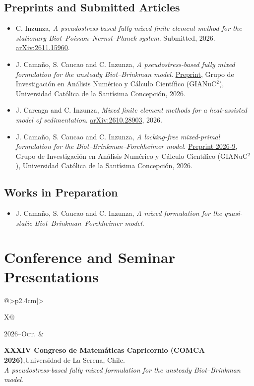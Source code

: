 \documentclass[letterpaper,12pt]{article}
\makeatletter
\newcommand{\CVEntry}[2]{%
\noindent\begin{tabularx}{\linewidth}{@{}>{\raggedleft\arraybackslash}p{2.4cm}|>{\raggedright\arraybackslash}X@{}}
\textsc{#1} & \begin{minipage}[t]{\linewidth}#2\end{minipage}
\end{tabularx}\vspace{0.45ex}}
\newcommand{\PubSpace}{\vspace{0.3mm}}
\makeatother
\begin{document}
\subsection*{Preprints and Submitted Articles}
\begin{itemize}
\item {\sc C. Inzunza},
    {\it A pseudostress-based fully mixed finite element method for the stationary Biot--Poisson--Nernst--Planck system}.
    Submitted, 2026. \href{https://arxiv.org/abs/2611.15960}{arXiv:2611.15960}.
\PubSpace
\item {\sc J. Cama\~no, S. Caucao and C. Inzunza},
    {\it A pseudostress-based fully mixed formulation for the unsteady Biot--Brinkman model}.
    \href{https://direcciones.ucsc.cl/content/uploads/sites/41/2026/11/camano-caucao-inzunza-2.pdf}{Preprint}, Grupo de Investigaci\'on en An\'alisis Num\'erico y C\'alculo Cient\'ifico (GIANuC$^{2}$), Universidad Cat\'olica de la Sant\'isima Concepci\'on, 2026.
\PubSpace
\item {\sc J. Careaga and C. Inzunza},
    {\it Mixed finite element methods for a heat-assisted model of sedimentation}.
    \href{https://arxiv.org/abs/2610.28903}{arXiv:2610.28903}, 2026.
\PubSpace
\item {\sc J. Cama\~no, S. Caucao and C. Inzunza},
    {\it A locking-free mixed-primal formulation for the Biot--Brinkman--Forchheimer model}.
    \href{https://direcciones.ucsc.cl/content/uploads/sites/41/2026/10/camano-caucao-inzunza-3.pdf}{Preprint 2026-9}, Grupo de Investigaci\'on en An\'alisis Num\'erico y C\'alculo Cient\'ifico (GIANuC$^{2}$), Universidad Cat\'olica de la Sant\'isima Concepci\'on, 2026.
\end{itemize}

\subsection*{Works in Preparation}
\begin{itemize}
\item {\sc J. Cama\~no, S. Caucao and C. Inzunza},
    {\it A mixed formulation for the quasi-static Biot--Brinkman--Forchheimer model}.
\end{itemize}

\section{Conference and Seminar Presentations}
\CVEntry{2026--Oct.}{%
\textbf{XXXIV Congreso de Matemáticas Capricornio (COMCA 2026)},\newline Universidad de La Serena, Chile.\\
\textit{A pseudostress-based fully mixed formulation for the unsteady Biot--Brinkman model}.}
\end{document}
